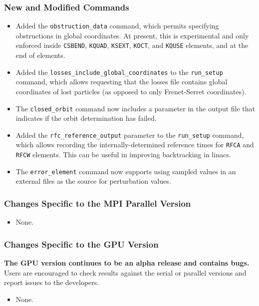 \documentclass[11pt]{article}
\begin{document}
\subsubsection{New and Modified Commands}
\begin{itemize}
\item Added the \verb|obstruction_data| command, which permits specifying obstructions in global coordinates.  At
present, this is experimental and only enforced inside \verb|CSBEND|, \verb|KQUAD|, \verb|KSEXT|, \verb|KOCT|, and
\verb|KQUSE| elements, and at the end of elements.
\item Added the \verb|losses_include_global_coordinates| to the \verb|run_setup| command, which allows requesting that
the losses file contains global coordinates of lost particles (as opposed to only Frenet-Serret coordinates).
\item The \verb|closed_orbit| command now includes a parameter in the output file that indicates if the orbit
determination has failed.
\item Added the \verb|rfc_reference_output| parameter to the \verb|run_setup| command, which allows recording the
internally-determined reference times for \verb|RFCA| and \verb|RFCW| elements. This can be useful in improving
backtracking in linacs.
\item The \verb|error_element| command now supports using sampled values in an external files as the source for
perturbation values.
\end{itemize}

\subsubsection{Changes Specific to the MPI Parallel Version}

\begin{itemize}
\item None.
\end{itemize}

\subsubsection{Changes Specific to the GPU Version}

{\bf The GPU version continues to be an alpha release and contains bugs.}  Users are encouraged to check results against
the serial or parallel versions and report issues to the developers.

\begin{itemize}
\item None.
\end{itemize}
\end{document}
